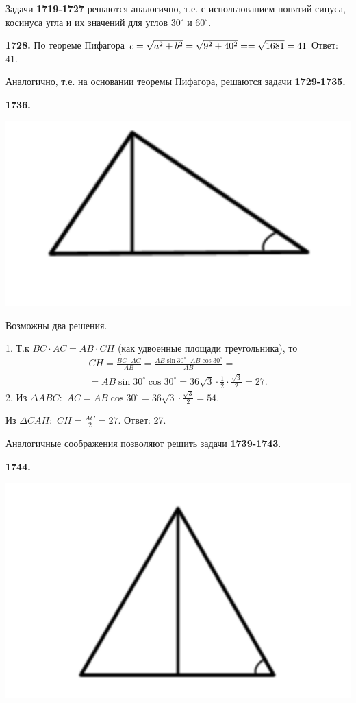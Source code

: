 Задачи \textbf{1719-1727} решаются аналогично, т.е. с использованием понятий синуса, косинуса угла и их значений для углов $30^\circ$ и $60^\circ$.

\textbf{1728.} По теореме Пифагора $c = \sqrt{a^2 + b^2} = \sqrt{9^2 + 40^2} = \linebreak = \sqrt{1681} = 41$ \newline \null \hspace*{\fill} Ответ: 41.

Аналогично, т.е. на основании теоремы Пифагора,  решаются задачи \textbf{1729-1735.}

\textbf{1736.}


{\centering \includegraphics[width=0.4\linewidth]{Geometry/Content/2.png}
	
}

Возможны два решения.

1. Т.к $BC \cdot AC = AB \cdot CH$ (как удвоенные площади треугольника), то 
\begin{eqnarray*}
CH = \frac{BC \cdot AC}{AB} = \frac{AB \sin{30^\circ}\cdot AB \cos{30^\circ}}{AB} = \\=AB \sin{30^\circ}\cos{30^\circ} = 36\sqrt{3}\cdot\frac{1}{2}\cdot\frac{\sqrt{3}}{2} = 27.
\end{eqnarray*}
2. Из $\Delta ABC:$ $AC = AB\cos{30^\circ} = 36\sqrt{3}\cdot \frac{\sqrt{3}}{2} = 54.$

Из $\Delta CAH:$ $CH = \frac{AC}{2} = 27.$ \newline \null \hspace*{\fill} Ответ: 27.

\clearpage 

Аналогичные соображения позволяют решить задачи  \textbf{1739-1743}.

\textbf{1744.}

{\centering \includegraphics[width=0.4\linewidth]{Geometry/Content/3.png}
	
}

